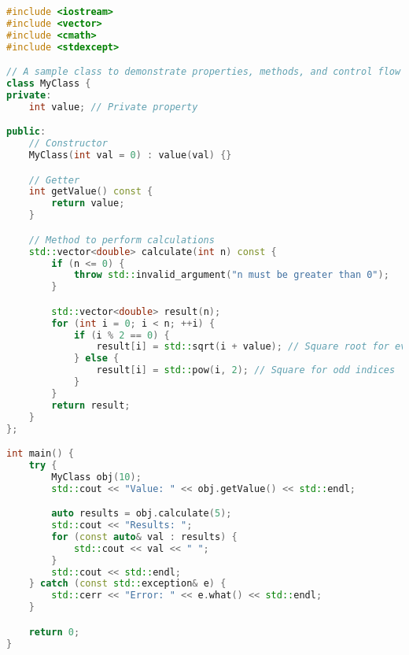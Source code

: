 \documentclass[12pt]{article}
\begin{document}
\begin{lstlisting}[caption={This is a literal C++}, label={lst:cpp1}, language=c++, style=customcpp]
#include <iostream>
#include <vector>
#include <cmath>
#include <stdexcept>

// A sample class to demonstrate properties, methods, and control flow
class MyClass {
private:
    int value; // Private property

public:
    // Constructor
    MyClass(int val = 0) : value(val) {}

    // Getter
    int getValue() const {
        return value;
    }

    // Method to perform calculations
    std::vector<double> calculate(int n) const {
        if (n <= 0) {
            throw std::invalid_argument("n must be greater than 0");
        }

        std::vector<double> result(n);
        for (int i = 0; i < n; ++i) {
            if (i % 2 == 0) {
                result[i] = std::sqrt(i + value); // Square root for even indices
            } else {
                result[i] = std::pow(i, 2); // Square for odd indices
            }
        }
        return result;
    }
};

int main() {
    try {
        MyClass obj(10);
        std::cout << "Value: " << obj.getValue() << std::endl;

        auto results = obj.calculate(5);
        std::cout << "Results: ";
        for (const auto& val : results) {
            std::cout << val << " ";
        }
        std::cout << std::endl;
    } catch (const std::exception& e) {
        std::cerr << "Error: " << e.what() << std::endl;
    }

    return 0;
}
\end{lstlisting}

\end{document}
